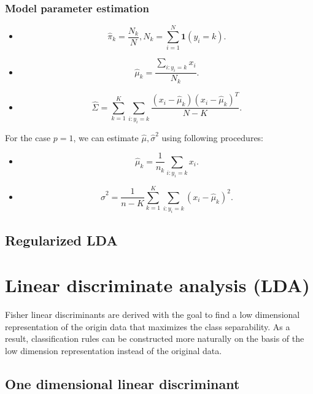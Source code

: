 \begin{refsection}
\subsubsection{Model parameter estimation}


\begin{lemma}
	\begin{itemize}
		\item $$\hat{\pi}_k = \frac{N_k}{N}, N_k = \sum_{i=1}^N \bm{1}(y_i = k).$$
		\item $$\hat{\mu}_k = \frac{\sum_{i:y_i =k} x_i}{N_k}.$$
		\item $$\hat{\Sigma} = \sum_{k=1}^K\sum_{i:y_i=k}\frac{(x_i - \hat{\mu}_k)(x_i - \hat{\mu}_k)^T}{N-K}.$$
	\end{itemize}	
\end{lemma}




\begin{corollary}\cite[108]{murphy2012machine}
	For the case $p = 1$, we can estimate $\hat{\mu}, \hat{\sigma}^2$ using following procedures:
	\begin{itemize}
		\item $$\hat{\mu}_k = \frac{1}{n_k}\sum_{i:y_i =k} x_i.$$ 
		\item $$\hat{\sigma}^2 = \frac{1}{n-K}\sum_{k=1}^K \sum_{i:y_i =k} (x_i - \hat{\mu}_k)^2.$$ 
	\end{itemize}
\end{corollary}




\subsection{Regularized LDA}





\section{Linear discriminate analysis (LDA) }


Fisher linear discriminants are derived with the goal to find a low dimensional representation of the origin data that maximizes the class separability. As a result, classification rules can be constructed more naturally on the basis of the low dimension representation instead of the original data.


\subsection{One dimensional linear discriminant}

\end{refsection}
